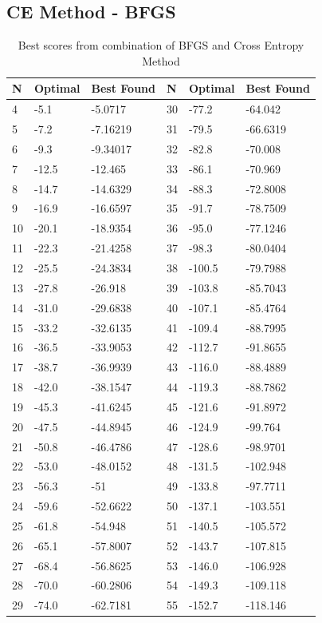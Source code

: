\documentclass[conference,letterpaper]{IEEEtran}
\begin{document}
\subsection{CE Method - BFGS}
\begin{table}[!ht]
    \begin{tabularx}{\columnwidth}{XXXXXX}
    N  & Optimal & Best Found & N  & Optimal & Best Found \\ \hline
    4  & -5.1    & -5.0717    & 30 & -77.2   & -64.042    \\
    5  & -7.2    & -7.16219   & 31 & -79.5   & -66.6319   \\
    6  & -9.3    & -9.34017   & 32 & -82.8   & -70.008    \\
    7  & -12.5   & -12.465    & 33 & -86.1   & -70.969    \\
    8  & -14.7   & -14.6329   & 34 & -88.3   & -72.8008   \\
    9  & -16.9   & -16.6597   & 35 & -91.7   & -78.7509   \\
    10 & -20.1   & -18.9354   & 36 & -95.0   & -77.1246   \\
    11 & -22.3   & -21.4258   & 37 & -98.3   & -80.0404   \\
    12 & -25.5   & -24.3834   & 38 & -100.5  & -79.7988   \\
    13 & -27.8   & -26.918    & 39 & -103.8  & -85.7043   \\
    14 & -31.0   & -29.6838   & 40 & -107.1  & -85.4764   \\
    15 & -33.2   & -32.6135   & 41 & -109.4  & -88.7995   \\
    16 & -36.5   & -33.9053   & 42 & -112.7  & -91.8655   \\
    17 & -38.7   & -36.9939   & 43 & -116.0  & -88.4889   \\
    18 & -42.0   & -38.1547   & 44 & -119.3  & -88.7862   \\
    19 & -45.3   & -41.6245   & 45 & -121.6  & -91.8972   \\
    20 & -47.5   & -44.8945   & 46 & -124.9  & -99.764    \\
    21 & -50.8   & -46.4786   & 47 & -128.6  & -98.9701   \\
    22 & -53.0   & -48.0152   & 48 & -131.5  & -102.948   \\
    23 & -56.3   & -51        & 49 & -133.8  & -97.7711   \\
    24 & -59.6   & -52.6622   & 50 & -137.1  & -103.551   \\
    25 & -61.8   & -54.948    & 51 & -140.5  & -105.572   \\
    26 & -65.1   & -57.8007   & 52 & -143.7  & -107.815   \\
    27 & -68.4   & -56.8625   & 53 & -146.0  & -106.928   \\
    28 & -70.0   & -60.2806   & 54 & -149.3  & -109.118   \\
    29 & -74.0   & -62.7181   & 55 & -152.7  & -118.146   \\ \hline
    \end{tabularx}
    \caption{Best scores from combination of BFGS and Cross Entropy Method}
    \label{BFGSCE_RESULTS}
\end{table}
\end{document}
